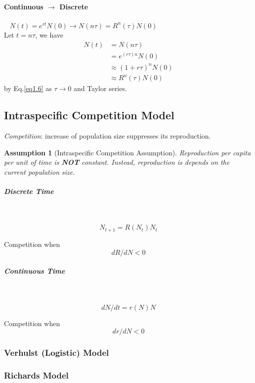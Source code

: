 \documentclass[12pt, a4paper, oneside]{article}
\newtheorem{assumption}{Assumption}[section]
\newcommand{\myref}[1]{Eq.\ref{#1}}
\begin{document}
\paragraph{Continuous $\rightarrow$ Discrete}~{
$
    N(t) = e^{rt}N(0) \rightarrow N(n\tau) = R^n(\tau) N(0)
$
}\\
Let $t=n\tau$, we have
\begin{align*}
    N(t) & =N(n\tau)                \\
         & =e^{(r\tau)n}N(0)        \\
         & \approx (1+r\tau)^n N(0) \\
         & \approx R^n(\tau)N(0)
\end{align*}
by \myref{eq1.6} as $\tau \rightarrow 0$ and Taylor series.


\newpage
\subsection{Intraspecific Competition Model}

\emph{Competition}: increase of population size suppresses its reproduction.

\begin{assumption}[Intraspecific Competition Assumption]
    Reproduction per capita per unit of time is \textbf{NOT} constant. Instead, reproduction is depends on the current population size.
\end{assumption}

\subparagraph{Discrete Time}~{
    $$
    N_{t+1} = R(N_t)N_t
    $$
    \par{Competition when}
    $$
    dR/dN <0
    $$
}
\subparagraph{Continuous Time}~{
    $$
    dN/dt = r(N)N
    $$
    \par{Competition when}
    $$
    dr/dN <0
    $$
}

\subsubsection{Verhulst (Logistic) Model}
 




\newpage
\subsubsection{Richards Model}
\end{document}
